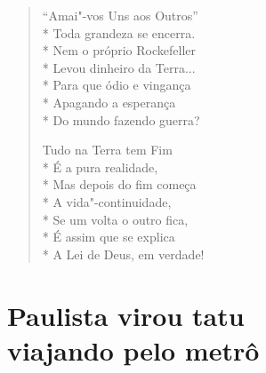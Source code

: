 \begin{verse}
``Amai"-vos Uns aos Outros''\\*
Toda grandeza se encerra.\\*
Nem o próprio Rockefeller\\*
Levou dinheiro da Terra...\\*
Para que ódio e vingança\\*
Apagando a esperança\\*
Do mundo fazendo guerra?

Tudo na Terra tem Fim\\*
É a pura realidade,\\*
Mas depois do fim começa\\*
A vida"-continuidade,\\*
Se um volta o outro fica,\\*
É assim que se explica\\*
A Lei de Deus, em verdade!
\end{verse}

\chapter[Paulista virou tatu viajando pelo metrô]{Paulista virou tatu\\ viajando pelo metrô}


